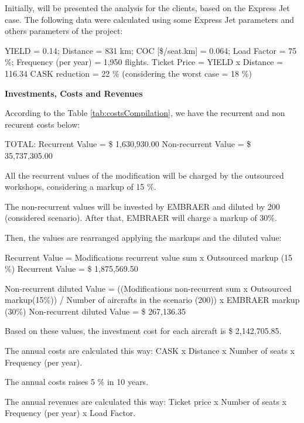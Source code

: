 Initially, will be presented the analysis for the clients, based on the Express Jet case. The following data were calculated using some Express Jet parameters and others parameters of the project:

YIELD = 0.14;
Distance = 831 km;
COC [\$/seat.km] = 0.064;
Load Factor = 75 \%;
Frequency (per year) = 1,950 flights.
Ticket Price = YIELD x Distance = 116.34
CASK reduction = 22 \% (considering the worst case = 18 \%)

\textbf{Investments, Costs and Revenues}

According to the Table \ref{tab:costsCompilation}, we have the recurrent and non recurent costs below:

TOTAL:
Recurrent Value = \$ 1,630,930.00
Non-recurrent Value = \$ 35,737,305.00

All the recurrent values of the modification will be charged by the outsourced workshops,
considering a markup of 15 \%.

The non-recurrent values will be invested by EMBRAER and diluted by 200 (considered scenario). After that, EMBRAER will charge a markup of 30\%.

Then, the values are rearranged applying the markups and the diluted value:

Recurrent Value = Modifications recurrent value sum x Outsourced markup (15 \%)  Recurrent Value = \$ 1,875,569.50

Non-recurrent diluted Value = ((Modifications non-recurrent sum x Outsourced markup(15\%)) / Number of aircrafts in the scenario (200)) x EMBRAER markup (30\%) Non-recurrent diluted Value = \$ 267,136.35

Based on these values, the investment cost for each aircraft is \$ 2,142,705.85.

The annual costs are calculated this way: CASK x Distance x Number of seats x Frequency (per year).

The annual costs raises 5 \% in 10 years.

The annual revenues are calculated this way: Ticket price x Number of seats x Frequency (per year) x Load Factor.

